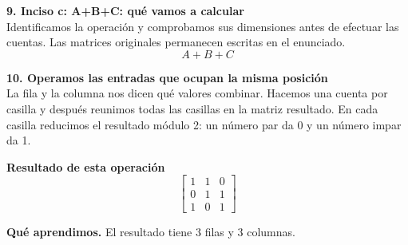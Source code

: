 \documentclass[11pt,a4paper,landscape]{article}
\begin{document}
\noindent\begin{minipage}{\linewidth}\textbf{9. Inciso c: A+B+C: qué vamos a calcular}\\[2pt]Identificamos la operación y comprobamos sus dimensiones antes de efectuar las cuentas. Las matrices originales permanecen escritas en el enunciado.
\[A+B+C\]
\end{minipage}\par\medskip
\noindent\begin{minipage}{\linewidth}\textbf{10. Operamos las entradas que ocupan la misma posición}\\[2pt]La fila y la columna nos dicen qué valores combinar. Hacemos una cuenta por casilla y después reunimos todas las casillas en la matriz resultado. En cada casilla reducimos el resultado módulo 2: un número par da 0 y un número impar da 1.
\par{}\par\smallskip
\par\smallskip \textbf{Resultado de esta operación}\[\begin{bmatrix}1 & 1 & 0\\0 & 1 & 1\\1 & 0 & 1\end{bmatrix}\]
\par\smallskip\textbf{Qué aprendimos.} El resultado tiene 3 filas y 3 columnas.
\end{minipage}\par\medskip
\end{document}
